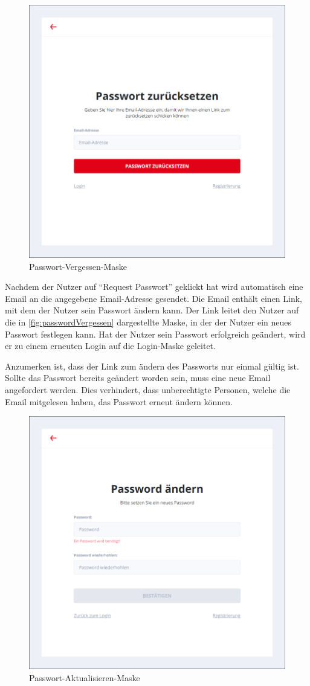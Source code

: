 \begin{figure}[h]
    \centering
    \includegraphics[width=.7\textwidth]{img/Passwort_zuruecksetzen.png}
    \caption{Passwort-Vergessen-Maske}
    \label{fig:passwordVergessen}
\end{figure}

Nachdem der Nutzer auf \enquote{Request Passwort} geklickt hat wird automatisch eine Email an die angegebene Email-Adresse gesendet.
Die Email enthält einen Link, mit dem der Nutzer sein Passwort ändern kann.
Der Link leitet den Nutzer auf die in \autoref{fig:passwordVergessen} dargestellte Maske, in der der Nutzer ein neues  Passwort festlegen kann. Hat der Nutzer sein Passwort erfolgreich geändert, wird er zu einem erneuten Login auf die Login-Maske geleitet.

Anzumerken ist, dass der Link zum ändern des Passworts nur einmal gültig ist.
Sollte das Passwort bereits geändert worden sein, muss eine neue Email angefordert werden.
Dies verhindert, dass unberechtigte Personen, welche die Email mitgelesen haben, das Passwort erneut ändern können.


\begin{figure}[h]
    \centering
    \includegraphics[width=.7\textwidth]{img/passwordReset2.png}
    \caption{Passwort-Aktualisieren-Maske}
    \label{fig:passwordVergessen2}
\end{figure}

